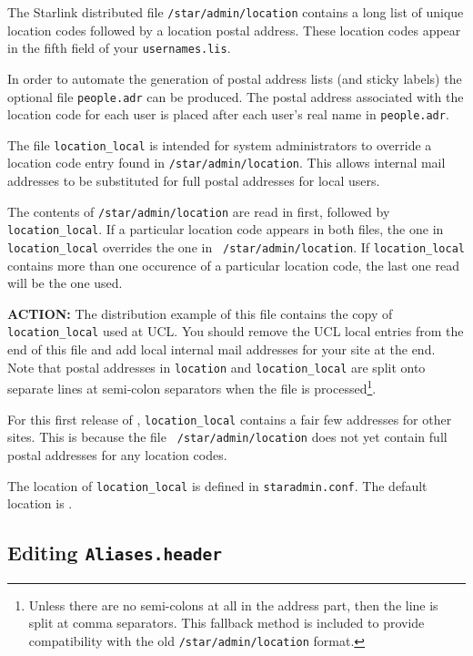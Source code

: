 The Starlink distributed file {\tt /star/admin/location} contains a long
list of unique location codes followed by a location postal address. These
location codes appear in the fifth field of your {\tt usernames.lis}. 

In order to automate the generation of postal address lists (and sticky
labels) the optional file {\tt people.adr} can be produced. The postal
address associated with the location code for each user is placed after
each user's real name in {\tt people.adr}. 

The file {\tt location\_local} is intended for system administrators to
override a location code entry found in {\tt /star/admin/location}. This
allows internal mail addresses to be substituted for full postal addresses
for local users. 

The contents of {\tt /star/admin/location} are read in first, followed by
{\tt location\_local}. If a particular location code appears in both
files, the one in {\tt location\_local} overrides the one in {\tt
/star/admin/location}. If {\tt location\_local} contains more than one
occurence of a particular location code, the last one read will be the one
used. 

{\large\bf ACTION:} The distribution example of this file contains the
copy of {\tt location\_local} used at UCL. You should remove the UCL local
entries from the end of this file and add local internal mail addresses
for your site at the end. Note that postal addresses in {\tt location} and
{\tt location\_local} are split onto separate lines at semi-colon
separators when the file is processed\footnote{Unless there are no
semi-colons at all in the address part, then the line is split at comma
separators. This fallback method is included to provide compatibility with
the old {\tt /star/admin/location} format.}. 

For this first release of \staradmin, {\tt location\_local} contains a
fair few addresses for other sites. This is because the file {\tt
/star/admin/location} does not yet contain full postal addresses for any
location codes. 

The location of {\tt location\_local} is defined in {\tt staradmin.conf}.
The default location is . 

\subsection{Editing {\tt Aliases.header}}

